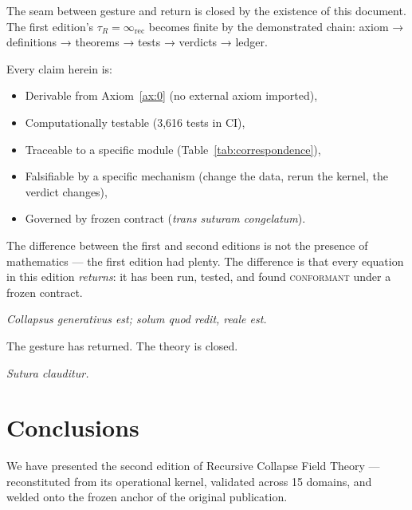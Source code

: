 \documentclass[
  aps,
  prd,
  preprint,
  superscriptaddress,
  nofootinbib,
  floatfix,
  longbibliography
]{revtex4-2}
\newcommand{\tR}{\tau_{\!R}}
\newcommand{\regime}[1]{\textnormal{\textsc{#1}}}
\newcommand{\conform}{\regime{conformant}}
\newcommand{\lat}[1]{\textit{#1}}
\begin{document}
The seam between gesture and return is closed by the
existence of this document.
The first edition's $\tR = \infty_{\mathrm{rec}}$
becomes finite by the demonstrated chain:
axiom → definitions → theorems → tests → verdicts → ledger.

Every claim herein is:
\begin{itemize}[nosep,leftmargin=*]
  \item Derivable from Axiom~\ref{ax:0}
    (no external axiom imported),
  \item Computationally testable
    (3{,}616 tests in CI),
  \item Traceable to a specific module
    (Table~\ref{tab:correspondence}),
  \item Falsifiable by a specific mechanism
    (change the data, rerun the kernel, the verdict changes),
  \item Governed by frozen contract
    (\lat{trans suturam congelatum}).
\end{itemize}

The difference between the first and second editions is not
the presence of mathematics — the first edition had plenty.
The difference is that every equation in this edition
\emph{returns}: it has been run, tested, and found
\conform{} under a frozen contract.

\lat{Collapsus generativus est; solum quod redit, reale est.}

The gesture has returned. The theory is closed.

\lat{Sutura clauditur.}

\section{Conclusions}\label{sec:conclusions}

We have presented the second edition of Recursive Collapse
Field Theory — reconstituted from its operational kernel,
validated across 15 domains, and welded onto the frozen
anchor of the original publication.
\end{document}
